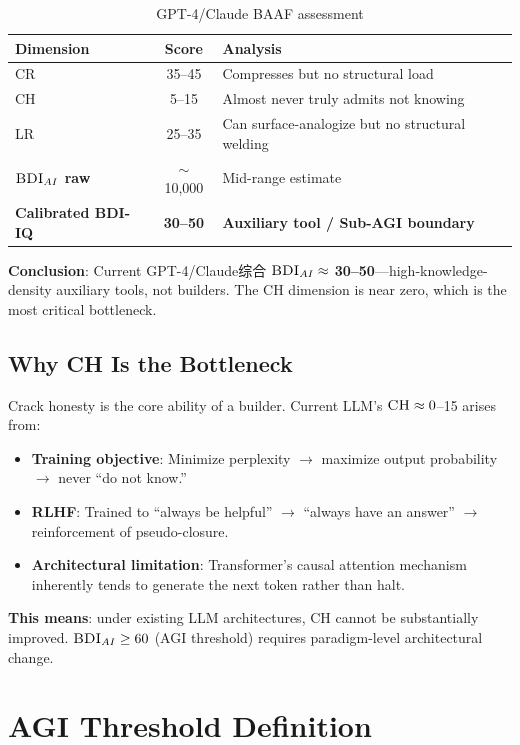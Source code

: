 \documentclass[11pt,a4paper]{article}
\theoremstyle{definition}
\theoremstyle{plain}
\newcommand{\BDI}{\textsc{BDI}}
\newcommand{\BAAF}{\textsc{BAAF}}
\newcommand{\CR}{\textsc{CR}}
\newcommand{\CH}{\textsc{CH}}
\newcommand{\LR}{\textsc{LR}}
\begin{document}
\begin{table}[htbp]
\centering
\caption{GPT-4/Claude \BAAF{} assessment}
\label{tab:gpt4-assessment}
\begin{tabular}{@{}lcl@{}}
\toprule
\textbf{Dimension} & \textbf{Score} & \textbf{Analysis} \\
\midrule
\CR{} & 35--45 & Compresses but no structural load \\
\CH{} & 5--15 & Almost never truly admits not knowing \\
\LR{} & 25--35 & Can surface-analogize but no structural welding \\
\midrule
\textbf{$\BDI_{AI}$ raw} & $\sim$10,000 & Mid-range estimate \\
\textbf{Calibrated \BDI{}-IQ} & \textbf{30--50} & \textbf{Auxiliary tool / Sub-AGI boundary} \\
\bottomrule
\end{tabular}
\end{table}

\textbf{Conclusion}: Current GPT-4/Claude综合 $\BDI_{AI} \approx$ \textbf{30--50}---high-knowledge-density auxiliary tools, not builders. The \CH{} dimension is near zero, which is the most critical bottleneck.

\subsection{Why \CH{} Is the Bottleneck}

Crack honesty is the core ability of a builder. Current LLM's $\CH{} \approx 0$--15 arises from:
\begin{itemize}
    \item \textbf{Training objective}: Minimize perplexity $\rightarrow$ maximize output probability $\rightarrow$ never ``do not know.''
    \item \textbf{RLHF}: Trained to ``always be helpful'' $\rightarrow$ ``always have an answer'' $\rightarrow$ reinforcement of pseudo-closure.
    \item \textbf{Architectural limitation}: Transformer's causal attention mechanism inherently tends to generate the next token rather than halt.
\end{itemize}

\textbf{This means}: under existing LLM architectures, \CH{} cannot be substantially improved. $\BDI_{AI} \geq 60$ (AGI threshold) requires paradigm-level architectural change.

\section{AGI Threshold Definition}
\label{sec:threshold}
\end{document}

